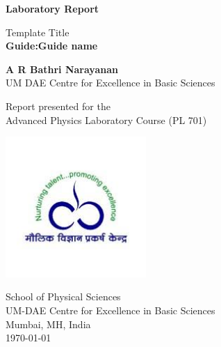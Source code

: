 \begin{titlepage}
	\begin{center}
		\vspace*{1cm}
		
		\Huge
		\textbf{Laboratory Report}
		
		\vspace{0.5cm}
		\LARGE
		Template Title\\
		\vspace{0.5cm}
		\textbf{Guide:Guide name}
		
		\vspace{1.5cm}
		
		\textbf{A R Bathri Narayanan}\\
		UM DAE Centre for Excellence in Basic Sciences
		
		\vspace{4 cm}
		
		Report presented for the\\
		Advanced Physics Laboratory Course (PL 701)
		
		\vspace{0.8cm}
		
		\includegraphics[width=0.4\textwidth]{cebs.jpg}
		
		\Large
		School of Physical Sciences\\
		UM-DAE Centre for Excellence in Basic Sciences\\
		Mumbai, MH, India\\
		\today
		
	\end{center}
\end{titlepage}